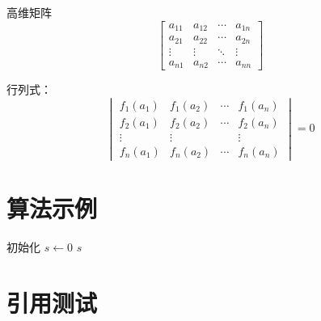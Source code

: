 \documentclass[a4paper,AutoFakeBold={2.7},UTF8,zihao=5,twoside]{ctexart} %
\numberwithin{equation}{section}%
\theoremstyle{definition}%
\begin{document}
高维矩阵
\begin{equation}
    \begin{bmatrix}
        a_{11} & a_{12} & \cdots & a_{1n} \\
        a_{21} & a_{22} & \cdots & a_{2n} \\
        \vdots & \vdots & \ddots & \vdots \\
        a_{n1} & a_{n2} & \cdots & a_{nn}
    \end{bmatrix}
\end{equation}

行列式：
\begin{equation}
    \begin{vmatrix}
        f_1(a_1) & f_1(a_2) & \cdots & f_1(a_n) \\
        f_2(a_1) & f_2(a_2) & \cdots & f_2(a_n) \\
        \vdots   & \vdots   &        & \vdots   \\
        f_n(a_1) & f_n(a_2) & \cdots & f_n(a_n)
    \end{vmatrix}
    = 0
\end{equation}

\clearpage

\section{算法示例}

\begin{algorithm}
    \caption{累加求和算法}

    初始化 $s \gets 0$\;
    \Return $s$\;
\end{algorithm}

\clearpage

\printbibliography[heading=centeredBib, title=参考文献]%
\clearpage

\appendix
{}%

\section{引用测试}
\end{document}
